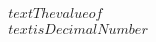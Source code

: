 \documentclass[preview]{standalone}
\begin{document}
\begin{align*}
\quad\\text{The value of } \quad\\text{ is } DecimalNumber
\end{align*}
\end{document}
